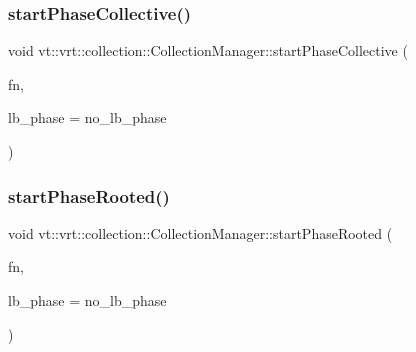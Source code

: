 \mbox{\label{structvt_1_1vrt_1_1collection_1_1_collection_manager_af7522c6048b723201d966094adfefa94}} 
\subsubsection{\texorpdfstring{start\+Phase\+Collective()}{startPhaseCollective()}}
{\footnotesize\ttfamily void vt\+::vrt\+::collection\+::\+Collection\+Manager\+::start\+Phase\+Collective (\begin{DoxyParamCaption}\item[{\hyperlink{structvt_1_1vrt_1_1collection_1_1_collection_manager_a2649daab7b437e1e2bdb5f2eefff29b6}{Action\+Finished\+L\+B\+Type}}]{fn,  }\item[{\hyperlink{namespacevt_a46ce6733d5cdbd735d561b7b4029f6d7}{Phase\+Type}}]{lb\+\_\+phase = {\ttfamily no\+\_\+lb\+\_\+phase} }\end{DoxyParamCaption})}

\mbox{\label{structvt_1_1vrt_1_1collection_1_1_collection_manager_aa3fe8c93775fd9c4878968112503a428}} 
\subsubsection{\texorpdfstring{start\+Phase\+Rooted()}{startPhaseRooted()}}
{\footnotesize\ttfamily void vt\+::vrt\+::collection\+::\+Collection\+Manager\+::start\+Phase\+Rooted (\begin{DoxyParamCaption}\item[{\hyperlink{structvt_1_1vrt_1_1collection_1_1_collection_manager_a2649daab7b437e1e2bdb5f2eefff29b6}{Action\+Finished\+L\+B\+Type}}]{fn,  }\item[{\hyperlink{namespacevt_a46ce6733d5cdbd735d561b7b4029f6d7}{Phase\+Type}}]{lb\+\_\+phase = {\ttfamily no\+\_\+lb\+\_\+phase} }\end{DoxyParamCaption})}


